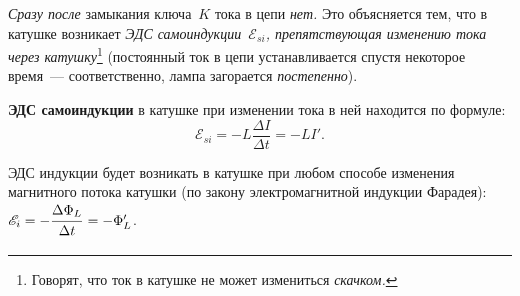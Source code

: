 \documentclass[main.tex]{subfiles}
\begin{document}






\emph{Сразу после} замыкания ключа~$K$ тока в цепи \emph{нет.} Это объясняется тем, что в катушке возникает \emph{ЭДС самоиндукции~$\mathscr E_{si}$, препятствующая изменению тока через катушку}\footnote{Говорят, что ток в катушке не может измениться \emph{скачком.}} (постоянный ток в цепи устанавливается спустя некоторое время~--- соответственно, лампа загорается \emph{постепенно}).

\textbf{ЭДС самоиндукции} в катушке при изменении тока в ней находится по формуле:
\begin{equation}
    \mathscr E_{si}=-L\frac{\Delta I}{\Delta t}=-LI'.
\end{equation}

ЭДС индукции будет возникать в катушке при любом способе изменения магнитного потока катушки (по закону электромагнитной индукции Фарадея): $\mathscr E_{i}=-\dfrac{\Delta \Phi_L\strut}{\Delta t\strut}=-\Phi_L'$.






 
\end{document}
